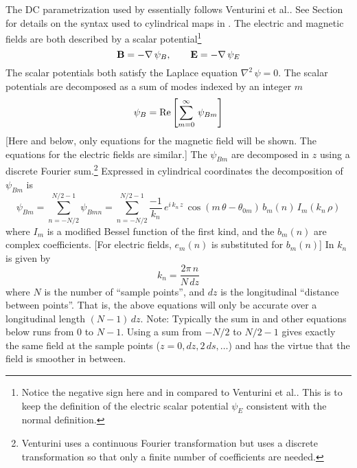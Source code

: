 The DC  parametrization used by \bmad essentially follows Venturini et
al.\cite{b:vent.map}. See Section~ for details on the syntax used to cylindrical
maps in \bmad. The electric and magnetic fields are both described by a scalar potential\footnote
  {
Notice the negative sign here and in  compared to Venturini et al.\cite{b:vent.map}. This
is to keep the definition of the electric scalar potential $\psi_E$ consistent with the normal
definition.
  }
\begin{equation}
  {\bf B} = -\nabla \, \psi_B, \qquad {\bf E} = -\nabla \, \psi_E
  \label{bpep}
\end{equation}
The scalar potentials both satisfy the Laplace equation $\nabla^2 \, \psi = 0$.
The scalar potentials are decomposed as a sum of modes indexed by an integer $m$
\begin{equation}
  \psi_B = \operatorname{Re} \left[ \sum_{m = 0}^\infty \, \psi_{Bm} \right]
\end{equation}
[Here and below, only equations for the magnetic field will be shown. The equations for the electric
fields are similar.] The $\psi_{Bm}$ are decomposed in $z$ using a discrete Fourier
sum.\footnote
  {
Venturini uses a continuous Fourier transformation but \bmad uses a discrete
transformation so that only a finite number of coefficients are needed.
  }
Expressed in cylindrical coordinates the decomposition of $\psi_{Bm}$ is
\begin{equation}
  \psi_{Bm} = \sum_{n=-N/2}^{N/2-1} \psi_{Bmn} =
  \sum_{n=-N/2}^{N/2-1} \frac{-1}{k_n} \, e^{i \, k_n \, z} \,
  \cos (m \, \theta - \theta_{0m}) \, b_m(n) \, I_m(k_n \, \rho)
  \label{psps1k}
\end{equation}
where $I_m$ is a modified Bessel function of the first kind, and the
$b_m(n)$ are complex coefficients. [For electric fields, $e_m(n)$ is
substituted for $b_m(n)$] In  $k_n$ is
given by
\begin{equation}
  k_n = \frac{2 \pi \, n}{N \, dz}
\end{equation}
where $N$ is the number of ``sample points'', and $dz$ is the longitudinal ``distance between
points''. That is, the above equations will only be accurate over a longitudinal length $(N-1)
\, dz$. Note: Typically the sum in  and other equations below runs from $0$ to $N-1$.
Using a sum from $-N/2$ to $N/2-1$ gives exactly the same field at the sample points ($z = 0, dz,
2\,ds, \ldots$) and has the virtue that the field is smoother in between.

